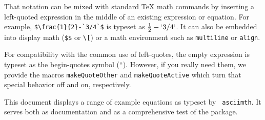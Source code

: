\documentclass{article}
\def\textbs{\char92\relax} %
\begin{document}
That notation can be mixed with standard \TeX{} math commands by
inserting a left-quoted expression in the middle of an existing expression or
equation.  For example, \verb|$\frac{1}{2}-`3/4`$| is typeset as 
$\frac{1}{2}-`3/4`$.  It can also be embedded into display math
(\verb|$$| or \verb|\[|) or a math environment such as {\tt multiline} or
\texttt{align}.

For compatibility with the common use of left-quotes, the empty expression 
{\tt{}} is typeset as the begin-quotes symbol (``).  
However, if you really need them, we provide the macros {\tt \textbs makeQuoteOther}
and {\tt\textbs makeQuoteActive} which turn that special behavior off and on, respectively.


This document displays a range of example equations as typeset by {\tt
asciimth}.  It serves both as documentation and as a comprehensive
test of the package.
\end{document}
